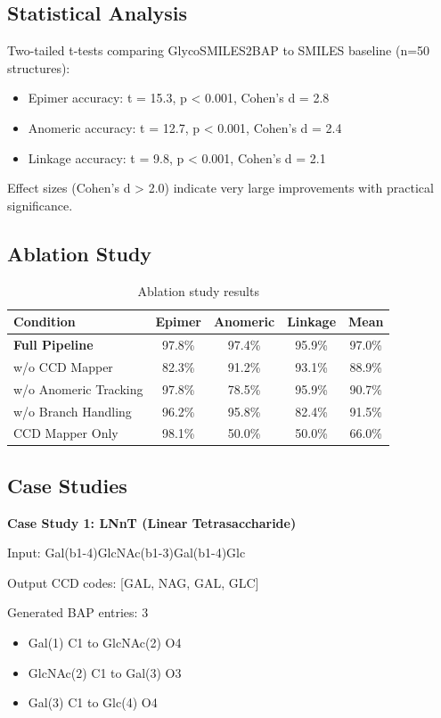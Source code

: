 \documentclass[11pt,a4paper]{article}
\begin{document}
\subsection{Statistical Analysis}

Two-tailed t-tests comparing GlycoSMILES2BAP to SMILES baseline (n=50 structures):
\begin{itemize}
\item Epimer accuracy: t = 15.3, p < 0.001, Cohen's d = 2.8
\item Anomeric accuracy: t = 12.7, p < 0.001, Cohen's d = 2.4
\item Linkage accuracy: t = 9.8, p < 0.001, Cohen's d = 2.1
\end{itemize}

Effect sizes (Cohen's d > 2.0) indicate very large improvements with practical significance.

\subsection{Ablation Study}

\begin{table}[h]
\centering
\begin{tabular}{lcccc}
\toprule
Condition & Epimer & Anomeric & Linkage & Mean \\
\midrule
\textbf{Full Pipeline} & 97.8\% & 97.4\% & 95.9\% & 97.0\% \\
w/o CCD Mapper & 82.3\% & 91.2\% & 93.1\% & 88.9\% \\
w/o Anomeric Tracking & 97.8\% & 78.5\% & 95.9\% & 90.7\% \\
w/o Branch Handling & 96.2\% & 95.8\% & 82.4\% & 91.5\% \\
CCD Mapper Only & 98.1\% & 50.0\% & 50.0\% & 66.0\% \\
\bottomrule
\end{tabular}
\caption{Ablation study results}
\end{table}

\subsection{Case Studies}

\textbf{Case Study 1: LNnT (Linear Tetrasaccharide)}

Input: Gal(b1-4)GlcNAc(b1-3)Gal(b1-4)Glc

Output CCD codes: [GAL, NAG, GAL, GLC]

Generated BAP entries: 3
\begin{itemize}
\item Gal(1) C1 to GlcNAc(2) O4
\item GlcNAc(2) C1 to Gal(3) O3
\item Gal(3) C1 to Glc(4) O4
\end{itemize}
\end{document}
